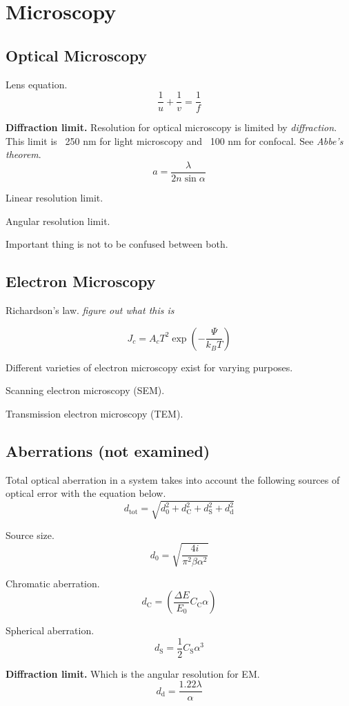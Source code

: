 \section{Microscopy}

\subsection*{Optical Microscopy}

Lens equation. $$\frac{1}{u} + \frac{1}{v} = \frac{1}{f}$$

\textbf{Diffraction limit.} Resolution for optical microscopy is limited by \textit{diffraction}. This limit is ~250 nm for light microscopy 
and ~100 nm for confocal. See \textit{Abbe's theorem}. $$a = \frac{\lambda}{2n \sin \alpha}$$

Linear resolution limit.

Angular resolution limit.

Important thing is not to be confused between both.

\subsection*{Electron Microscopy}

Richardson's law. \textit{figure out what this is}

\begin{equation*}
    J_c = A_c T^2 \exp \left(- \frac{\Psi}{k_B T}\right)
\end{equation*}

Different varieties of electron microscopy exist for varying purposes.

Scanning electron microscopy (SEM).

Transmission electron microscopy (TEM).

\subsection*{Aberrations (not examined)}
Total optical aberration in a system takes into account the following sources of optical error with the equation below.
\begin{equation*}
    d_{\mathrm{tot}} = \sqrt{d_0^2 + d_{\mathrm{C}}^2 + d_{\mathrm{S}}^2 + d_{\mathrm{d}}^2}
\end{equation*}

Source size.
\begin{equation*}
    d_0 = \sqrt{\frac{4i}{\pi^2 \beta \alpha^2}}
\end{equation*}

Chromatic aberration.
\begin{equation*}
    d_{\mathrm{C}} = \left( \frac{\Delta E}{E_0}C_{\mathrm{C}} \alpha \right)
\end{equation*}

Spherical aberration.
\begin{equation*}
    d_{\mathrm{S}}  = \frac{1}{2} C_{\mathrm{S}} \alpha^3
\end{equation*}

\textbf{Diffraction limit.} Which is the angular resolution for EM.
\begin{equation*}
    d_{\mathrm{d}} = \frac{1.22 \lambda}{\alpha}
\end{equation*}